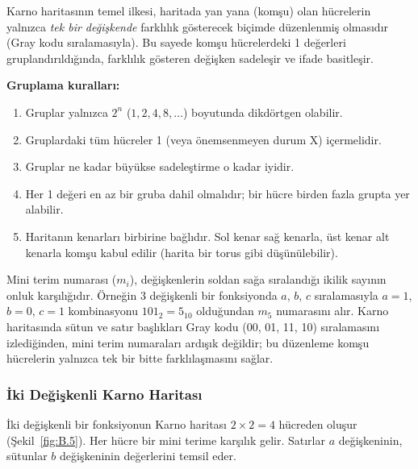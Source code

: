 Karno haritasının temel ilkesi, haritada yan yana (komşu) olan hücrelerin yalnızca \emph{tek bir değişkende} farklılık gösterecek biçimde düzenlenmiş olmasıdır (Gray kodu sıralamasıyla). Bu sayede komşu hücrelerdeki 1 değerleri gruplandırıldığında, farklılık gösteren değişken sadeleşir ve ifade basitleşir.

\textbf{Gruplama kuralları:}
\begin{enumerate}[nosep]
    \item Gruplar yalnızca $2^n$ ($1, 2, 4, 8, \ldots$) boyutunda dikdörtgen olabilir.
    \item Gruplardaki tüm hücreler 1 (veya önemsenmeyen durum X) içermelidir.
    \item Gruplar ne kadar büyükse sadeleştirme o kadar iyidir.
    \item Her 1 değeri en az bir gruba dahil olmalıdır; bir hücre birden fazla grupta yer alabilir.
    \item Haritanın kenarları birbirine bağlıdır. Sol kenar sağ kenarla, üst kenar alt kenarla komşu kabul edilir (harita bir torus gibi düşünülebilir).
\end{enumerate}

\begin{bilginot}
Mini terim numarası ($m_i$), değişkenlerin soldan sağa sıralandığı ikilik sayının onluk karşılığıdır. Örneğin 3 değişkenli bir fonksiyonda $a$, $b$, $c$ sıralamasıyla $a=1$, $b=0$, $c=1$ kombinasyonu $101_2 = 5_{10}$ olduğundan $m_5$ numarasını alır. Karno haritasında sütun ve satır başlıkları Gray kodu (00, 01, 11, 10) sıralamasını izlediğinden, mini terim numaraları ardışık değildir; bu düzenleme komşu hücrelerin yalnızca tek bir bitte farklılaşmasını sağlar.
\end{bilginot}

\subsubsection{İki Değişkenli Karno Haritası}

İki değişkenli bir fonksiyonun Karno haritası $2 \times 2 = 4$ hücreden oluşur (Şekil~\ref{fig:B.5}). Her hücre bir mini terime karşılık gelir. Satırlar $a$ değişkeninin, sütunlar $b$ değişkeninin değerlerini temsil eder.


